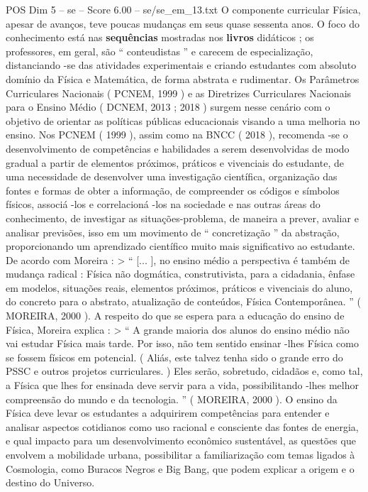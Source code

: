 \begin{textsample}{POS Dim 5 – se – Score 6.00 – se/se\_em\_13.txt}
O componente curricular Física, apesar de avanços, teve poucas mudanças em seus quase sessenta anos.
O foco do conhecimento está nas \textbf{sequências} mostradas nos \textbf{livros} didáticos ; os professores, em geral, são “ conteudistas ” e carecem de especialização, distanciando -se das atividades experimentais e criando estudantes com absoluto domínio da Física e Matemática, de forma abstrata e rudimentar.
Os Parâmetros Curriculares Nacionais ( PCNEM, 1999 ) e as Diretrizes Curriculares Nacionais para o Ensino Médio ( DCNEM, 2013 ; 2018 ) surgem nesse cenário com o objetivo de orientar as políticas públicas educacionais visando a uma melhoria no ensino.
Nos PCNEM ( 1999 ), assim como na BNCC ( 2018 ), recomenda -se o desenvolvimento de competências e habilidades a serem desenvolvidas de modo gradual a partir de elementos próximos, práticos e vivenciais do estudante, de uma necessidade de desenvolver uma investigação científica, organização das fontes e formas de obter a informação, de compreender os códigos e símbolos físicos, associá -los e correlacioná -los na sociedade e nas outras áreas do conhecimento, de investigar as situações-problema, de maneira a prever, avaliar e analisar previsões, isso em um movimento de “ concretização ” da abstração, proporcionando um aprendizado científico muito mais significativo ao estudante.
De acordo com Moreira : > “ [... ], no ensino médio a perspectiva é também de mudança radical : Física não dogmática, construtivista, para a cidadania, ênfase em modelos, situações reais, elementos próximos, práticos e vivenciais do aluno, do concreto para o abstrato, atualização de conteúdos, Física Contemporânea. ” ( MOREIRA, 2000 ).
A respeito do que se espera para a educação do ensino de Física, Moreira explica : > “ A grande maioria dos alunos do ensino médio não vai estudar Física mais tarde.
Por isso, não tem sentido ensinar -lhes Física como se fossem físicos em potencial. ( Aliás, este talvez tenha sido o grande erro do PSSC e outros projetos curriculares. ) Eles serão, sobretudo, cidadãos e, como tal, a Física que lhes for ensinada deve servir para a vida, possibilitando -lhes melhor compreensão do mundo e da tecnologia. ” ( MOREIRA, 2000 ).
O ensino da Física deve levar os estudantes a adquirirem competências para entender e analisar aspectos cotidianos como uso racional e consciente das fontes de energia, e qual impacto para um desenvolvimento econômico sustentável, as questões que envolvem a mobilidade urbana, possibilitar a familiarização com temas ligados à Cosmologia, como Buracos Negros e Big Bang, que podem explicar a origem e o destino do Universo.

\end{textsample}
